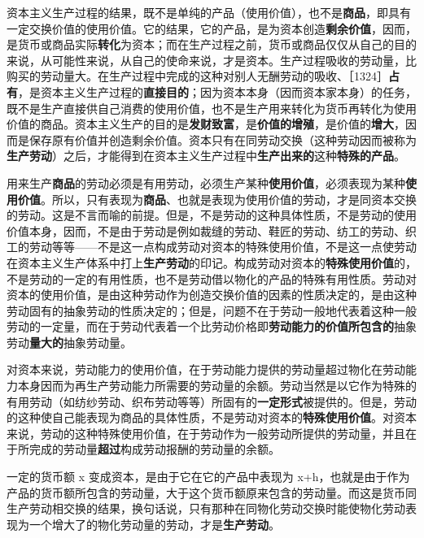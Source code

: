 
资本主义生产过程的结果，既不是单纯的产品（使用价值），也不是\textbf{商品}，即具有一定交换价值的使用价值。它的结果，它的产品，是为资本创造\textbf{剩余价值}，因而，是货币或商品实际\textbf{转化}为资本；而在生产过程之前，货币或商品仅仅从自己的目的来说，从可能性来说，从自己的使命来说，才是资本。生产过程吸收的劳动量，比购买的劳动量大。在生产过程中完成的这种对别人无酬劳动的吸收、［1324］\textbf{占有}，是资本主义生产过程的\textbf{直接目的}；因为资本本身（因而资本家本身）的任务，既不是生产直接供自己消费的使用价值，也不是生产用来转化为货币再转化为使用价值的商品。资本主义生产的目的是\textbf{发财致富}，是\textbf{价值的增殖}，是价值的\textbf{增大}，因而是保存原有价值并创造剩余价值。资本只有在同劳动交换（这种劳动因而被称为\textbf{生产劳动}）之后，才能得到在资本主义生产过程中\textbf{生产出来的}这种\textbf{特殊的产品}。

用来生产\textbf{商品}的劳动必须是有用劳动，必须生产某种\textbf{使用价值}，必须表现为某种\textbf{使用价值}。所以，只有表现为\textbf{商品}、也就是表现为使用价值的劳动，才是同资本交换的劳动。这是不言而喻的前提。但是，不是劳动的这种具体性质，不是劳动的使用价值本身，因而，不是由于劳动是例如裁缝的劳动、鞋匠的劳动、纺工的劳动、织工的劳动等等——不是这一点构成劳动对资本的特殊使用价值，不是这一点使劳动在资本主义生产体系中打上\textbf{生产劳动}的印记。构成劳动对资本的\textbf{特殊使用价值}的，不是劳动的一定的有用性质，也不是劳动借以物化的产品的特殊有用性质。劳动对资本的使用价值，是由这种劳动作为创造交换价值的因素的性质决定的，是由这种劳动固有的抽象劳动的性质决定的；但是，问题不在于劳动一般地代表着这种一般劳动的一定量，而在于劳动代表着一个比劳动价格即\textbf{劳动能力的价值所包含的}抽象劳动\textbf{量大的}抽象劳动量。

对资本来说，劳动能力的使用价值，在于劳动能力提供的劳动量超过物化在劳动能力本身因而为再生产劳动能力所需要的劳动量的余额。劳动当然是以它作为特殊的有用劳动（如纺纱劳动、织布劳动等等）所固有的\textbf{一定形式}被提供的。但是，劳动的这种使自己能表现为商品的具体性质，不是劳动对资本的\textbf{特殊使用价值}。对资本来说，劳动的这种特殊使用价值，在于劳动作为一般劳动所提供的劳动量，并且在于所完成的劳动量\textbf{超过}构成劳动报酬的劳动量的余额。

一定的货币额 x 变成资本，是由于它在它的产品中表现为 x+h，也就是由于作为产品的货币额所包含的劳动量，大于这个货币额原来包含的劳动量。而这是货币同生产劳动相交换的结果，换句话说，只有那种在同物化劳动交换时能使物化劳动表现为一个增大了的物化劳动量的劳动，才是\textbf{生产劳动}。

